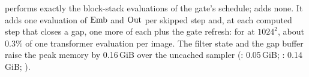 \ours performs exactly the block-stack evaluations of the gate's schedule; \pcgs adds none. It adds one evaluation of
$\operatorname{Emb}$ and $\operatorname{Out}$ per skipped step and, at each computed step that closes a gap, one more of each plus the gate
refresh: for \flux at $1024^2$, about 0.3\% of one transformer evaluation per image. The filter state and the gap
buffer raise the peak memory by 0.16\,GiB over the uncached sampler (\seacache: 0.05\,GiB; \kalsea: 0.14\,GiB;
).
